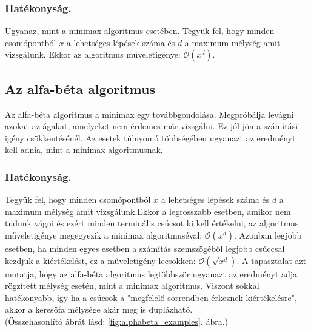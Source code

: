 \documentclass[twoside, a4paper, 12pt]{article}
\begin{document}
\subsubsection{Hatékonyság.} Ugyanaz, mint a minimax algoritmus esetében. Tegyük fel, hogy minden csomópontból $x$ a lehetséges lépések száma és $d$ a maximum mélység amit vizsgálunk. Ekkor az algoritmus műveletigénye: $ \mathcal{O}(x^d)$.

\subsection{Az alfa-béta algoritmus}
Az alfa-béta algoritmus a minimax egy továbbgondolása. Megpróbálja levágni azokat az ágakat, amelyeket nem érdemes már vizsgálni. Ez jól jön a számítási-igény csökkentésénél. Az esetek túlnyomó többségében ugyanazt az eredményt kell adnia, mint a minimax-algoritmusnak.

\subsubsection{Hatékonyság.} Tegyük fel, hogy minden csomópontból $x$ a lehetséges lépések száma és $d$ a maximum mélység amit vizsgálunk.Ekkor a legrosszabb esetben, amikor nem tudunk vágni és ezért minden terminális csúcsot ki kell értékelni, az algoritmus műveletigénye megegyezik a minimax algoritmuséval: $ \mathcal{O}(x^d)$.
Azonban legjobb esetben, ha minden egyes esetben a számítás szemszögéből legjobb csúccsal kezdjük a kiértékelést, ez a műveletigény lecsökken: $\mathcal{O}(\sqrt{x^d})$.
A tapasztalat azt mutatja, hogy az alfa-béta algoritmus legtöbbször ugyanazt az eredményt adja rögzített mélység esetén, mint a minimax algoritmus. Viszont sokkal hatékonyabb, így ha a csúcsok a "megfelelő sorrendben érkeznek kiértékelésre", akkor a keresőfa mélysége akár meg is duplázható. \\ (Összehasonlító ábrát lásd: \ref{fig:alphabeta_examples}. ábra.)
\end{document}
